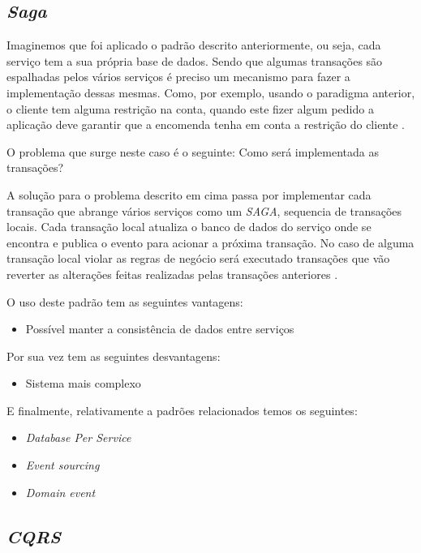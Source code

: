 \subsection{\textit{Saga}}
Imaginemos que foi aplicado o padrão descrito anteriormente, ou seja, cada serviço tem a sua própria base de dados. Sendo que algumas transações são espalhadas pelos vários serviços é preciso um mecanismo para fazer a implementação dessas mesmas. Como, por exemplo, usando o paradigma anterior, o cliente tem alguma restrição na conta, quando este fizer algum pedido a aplicação deve garantir que a encomenda tenha em conta a restrição do cliente \cite{sagaPattern}.

O problema que surge neste caso é o seguinte: Como será implementada as transações? \cite{sagaPattern}

A solução para o problema descrito em cima passa por implementar cada transação que abrange vários serviços como um \textit{SAGA}, sequencia de transações locais. Cada transação local atualiza o banco de dados do serviço onde se encontra e publica o evento para acionar a próxima transação. No caso de alguma transação local violar as regras de negócio será executado transações que vão reverter as alterações feitas realizadas pelas transações anteriores \cite{sagaPattern}.

O uso deste padrão tem as seguintes vantagens:
\begin{itemize}
    \item Possível manter a consistência de dados entre serviços \cite{sagaPattern}
\end{itemize}

Por sua vez tem as seguintes desvantagens:
\begin{itemize}
    \item Sistema mais complexo \cite{sagaPattern}
\end{itemize}

E finalmente, relativamente a padrões relacionados temos os seguintes:
\begin{itemize}
    \item \textit{Database Per Service}
    \item \textit{Event sourcing}
    \item \textit{Domain event}
\end{itemize}

\subsection{\textit{CQRS}}

